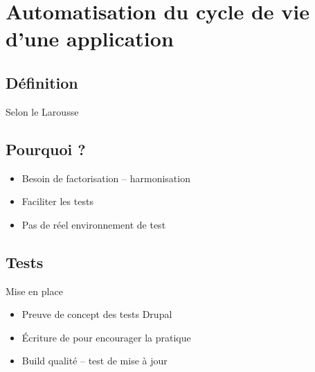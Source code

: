 \section[Automatisation]{Automatisation du cycle de vie d'une application}

\subsection{Définition}
\begin{frame}{\subsecname}
	\begin{block}{Selon le Larousse}
	\end{block}
\end{frame}

\subsection{Pourquoi ?}
\begin{frame}{\subsecname}
	\begin{center}
		\begin{minipage}{0.5\textwidth}
			\begin{itemize}
				\item Besoin de factorisation -- harmonisation
				\pause
				\item Faciliter les tests
				\pause
				\item Pas de réel environnement de test
			\end{itemize}
		\end{minipage}
	\end{center}
\end{frame}

\subsection{Tests}
\begin{frame}{\subsecname}
\begin{block}{Mise en place}
	\begin{itemize}
		\item Preuve de concept des tests Drupal
		\item Écriture de  pour encourager la pratique
		\item Build qualité -- test de mise à jour
	\end{itemize}
\end{block}
\end{frame}

